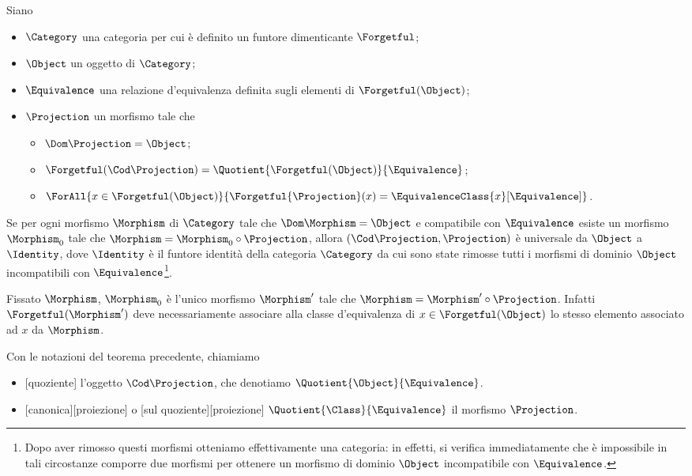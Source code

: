 \begin{Theorem}
	Siano
	\begin{itemize}
		\item $\Category$ una categoria per cui \`e definito un funtore
		dimenticante $\Forgetful$;
		\item $\Object$ un oggetto di $\Category$;
		\item $\Equivalence$ una relazione d'equivalenza definita sugli
		elementi di $\Forgetful(\Object)$;
		\item $\Projection$ un morfismo tale che
		\begin{itemize}
			\item $\Dom \Projection = \Object$;
			\item $\Forgetful(\Cod \Projection) =
			\Quotient{\Forgetful(\Object)}{\Equivalence}$;
			\item $\ForAll{x \in \Forgetful(\Object)}{
			\Forgetful{\Projection}(x) =
			\EquivalenceClass{x}[\Equivalence]}$.
		\end{itemize}
	\end{itemize}
	Se per ogni morfismo $\Morphism$ di $\Category$ tale che
	$\Dom \Morphism = \Object$ e compatibile con
	$\Equivalence$	esiste un morfismo $\Morphism_0$ tale che
	$\Morphism = \Morphism_0 \circ \Projection$,
	allora $(\Cod \Projection, \Projection)$ \`e universale da
	$\Object$ a $\Identity$, dove $\Identity$ \`e il funtore
	identit\`a della categoria $\Category$ da cui sono state rimosse
	tutti i morfismi di dominio $\Object$ incompatibili con
	$\Equivalence$\footnote{Dopo aver rimosso questi morfismi
	otteniamo effettivamente una categoria: in effetti, si verifica
	immediatamente che \`e impossibile in tali circostanze comporre
	due morfismi per ottenere un morfismo di dominio $\Object$
	incompatibile con $\Equivalence$.}.
\end{Theorem}
\Proof Fissato $\Morphism$, $\Morphism_0$ \`e l'unico morfismo $\Morphism'$ tale che $\Morphism = \Morphism' \circ \Projection$. Infatti $\Forgetful(\Morphism')$ deve necessariamente associare alla classe d'equivalenza di $x \in \Forgetful(\Object)$ lo stesso elemento associato ad $x$ da $\Morphism$. \EndProof
\begin{Definition}
	Con le notazioni del teorema precedente, chiamiamo
	\begin{itemize}
		\item {}[quoziente] l'oggetto
		$\Cod \Projection$, che denotiamo
		$\Quotient{\Object}{\Equivalence}$.
		\item {}[canonica][proiezione] o
		[sul quoziente][proiezione]
		$\Quotient{\Class}{\Equivalence}$ il morfismo $\Projection$.
	\end{itemize}
\end{Definition}
